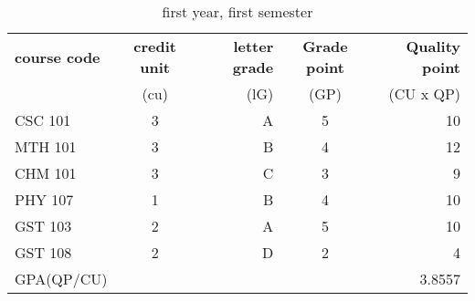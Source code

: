 \documentclass{article}
\begin{document}
	\begin{table}[h!]
		\begin{center}
			\caption{first year, first semester}
			\label{tab:table1}
			\begin{tabular}{l|c|r|c|r}
				\textbf{course code} & \textbf{credit unit} & \textbf{letter grade} &\textbf{Grade point} & \textbf{Quality point}\\
				&(cu) &(lG) & (GP) & (CU x QP)\\
				\hline
	\cellcolor{red!50}CSC 101 & 3 & A & 5 & 10\\
				MTH 101 & 3 & B & 4 & 12\\
				CHM 101 & 3 & C & 3 & 9\\
				PHY 107 & 1 & B & 4 & 10\\
				GST 103 & 2 & A & 5 & 10\\
				GST 108 & 2 & D & 2 & 4\\
				GPA(QP/CU) & & & &3.8557
			\end{tabular}
		\end{center}
	\end{table}
\end{document}
